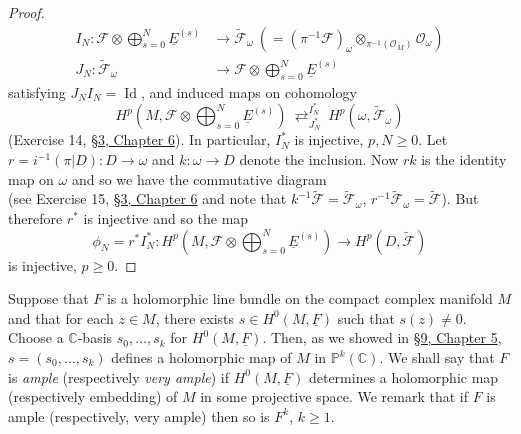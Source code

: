 \begin{proof}
\[
\begin{aligned}
I_N:\mathcal{F}\otimes\bigoplus_{s=0}^N\underline{E}^{(s)}&\longrightarrow\widetilde{\mathcal{F}}_\omega
\ \left(=(\pi^{-1}\mathcal{F})_\omega\otimes_{\pi^{-1}(\mathcal{O}_M)}\mathcal{O}_\omega\right)\\
J_N:\widetilde{\mathcal{F}}_\omega&\longrightarrow\mathcal{F}\otimes\bigoplus_{s=0}^N\underline{E}^{(s)}
\end{aligned}
\]
satisfying $J_NI_N=\operatorname{Id}$, and induced maps on cohomology
\[
H^p\left(M,\mathcal{F}\otimes\bigoplus_{s=0}^N\underline{E}^{(s)}\right)
\ \mathop{\rightleftarrows}^{I_N^*}_{J_N^*}\ H^p(\omega,\widetilde{\mathcal{F}}_\omega)
\]
(Exercise 14, \hyperref[sec:6:3]{\S3, Chapter 6}). In particular, $I_N^*$ is injective, $p,N\geq0$. Let $r=i^{-1}(\pi|D):D\to\omega$ and $k:\omega\to D$ denote the inclusion. Now $rk$ is the identity map on $\omega$ and so we have the commutative diagram
\[

\]
(see Exercise 15, \hyperref[sec:6:3]{\S3, Chapter 6} and note that $k^{-1}\widetilde{\mathcal{F}}=\widetilde{\mathcal{F}}_\omega$, $r^{-1}\widetilde{\mathcal{F}}_\omega=\widetilde{\mathcal{F}}$). But therefore $r^*$ is injective and so the map
\[
\phi_N=r^*I_N^*:H^p\left(M,\mathcal{F}\otimes\bigoplus_{s=0}^N\underline{E}^{(s)}\right)\longrightarrow H^p(D,\widetilde{\mathcal{F}})
\]
is injective, $p\geq0$.
\end{proof}

Suppose that $F$ is a holomorphic line bundle on the compact complex manifold $M$ and that for each $z\in M$, there exists $s\in H^0(M,\underline{F})$ such that $s(z)\ne0$. Choose a $\mathbb{C}$-basis $s_0,\ldots,s_k$ for $H^0(M,\underline{F})$. Then, as we showed in \hyperref[sec:5:9]{\S9, Chapter 5}, $s=(s_0,\ldots,s_k)$ defines a holomorphic map of $M$ in $\mathbb{P}^k(\mathbb{C})$. We shall say that $F$ is \emph{ample} (respectively \emph{very ample}) if $H^0(M,\underline{F})$ determines a holomorphic map (respectively embedding) of $M$ in some projective space. We remark that if $F$ is ample (respectively, very ample) then so is $F^k$, $k\geq1$.

